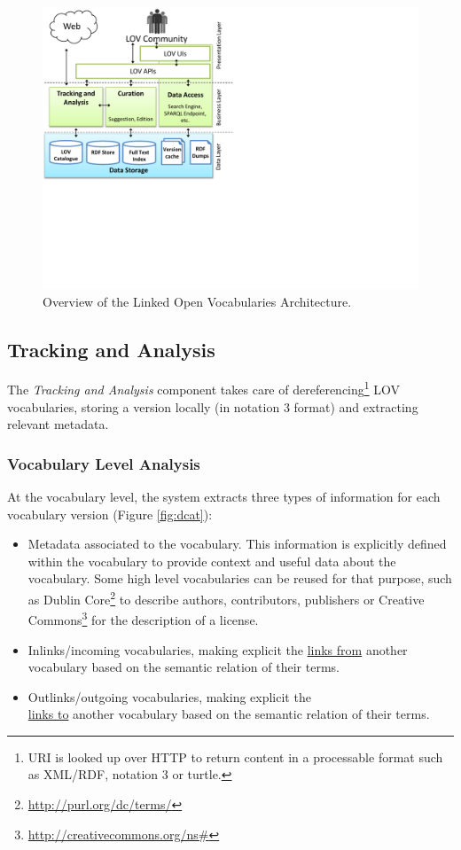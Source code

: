 \documentclass{iosart2c}
\begin{document}
\begin{figure}[ht!b]
\includegraphics[trim={0cm 7cm 0cm 0cm},scale=.6]{lov_architecture.pdf}
\caption{Overview of the Linked Open Vocabularies Architecture.}
\label{fig:arch}
\end{figure}

\subsection{Tracking and Analysis}
	The \emph{Tracking and Analysis} component takes care of dereferencing\footnote{URI is looked up over HTTP to return content in a processable format such as XML/RDF, notation 3 or turtle.} LOV vocabularies, storing a version locally (in notation 3 format) and extracting relevant metadata.

\subsubsection{Vocabulary Level Analysis}\label{sec:vocabLevelAnalysis}
At the vocabulary level, the system extracts three types of information for each vocabulary version (Figure \ref{fig:dcat}):
\begin{itemize}
\item Metadata associated to the vocabulary. This information is explicitly defined within the vocabulary to provide context and useful data about the vocabulary. Some high level vocabularies can be reused for that purpose, such as Dublin Core\footnote{\url{http://purl.org/dc/terms/}} to describe authors, contributors, publishers or Creative Commons\footnote{\url{http://creativecommons.org/ns\#}} for the description of a license.

\item Inlinks/incoming vocabularies, making explicit the \underline{links from} another vocabulary based on the semantic relation of their terms.

\item Outlinks/outgoing vocabularies, making explicit the\\ \underline{links to} another vocabulary based on the semantic relation of their terms.
\end{itemize}
\end{document}
